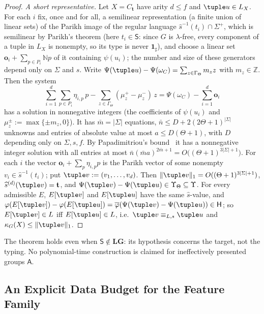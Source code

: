 \begin{proof}
\emph{A short representative.}  Let $X=C_{\mathbf t}$ have arity $d\le f$ and
$\tuple u\in L_X$.  For each $i$ fix, once and for all, a semilinear representation
(a finite union of linear sets) of the Parikh image of the regular language $\widehat s^{-1}(t_i)\cap\Sigma^+$,
which is semilinear by Parikh's theorem \cite{Parikh1966}
(here $t_i\in\mathsf S$: since $G$ is $\lambda$-free, every component of a tuple in
$L_X$ is nonempty, so its type is never $\mathbf 1_\sharp$), and
choose a linear set $\mathbf o_i+\sum_{p\in P_i}\mathbb Np$ of it containing $\psi(u_i)$;
the number and size of these generators depend only on $\Sigma$ and $s$.  Write
$\Psi(\tuple u)-\Psi(\omega_C)=\sum_{z\in\Gamma_\Theta}m_zz$ with $m_z\in\mathbb Z$.
Then the system
\[
 \sum_{i=1}^d\sum_{p\in P_i}\eta_{i,p}\,p-\sum_{z\in\Gamma_\Theta}(\mu^+_z-\mu^-_z)\,z
 =\Psi(\omega_C)-\sum_{i=1}^d\mathbf o_i
\]
has a solution in nonnegative integers (the coefficients of $\psi(u_i)$ and
$\mu^\pm_z:=\max\{\pm m_z,0\}$).  It has $\bar m=|\Sigma|$ equations,
$\bar n\le D+2(2\Theta+1)^{|\Sigma|}$ unknowns and entries of absolute value at most
$a\le D(\Theta+1)$, with $D$ depending only on $\Sigma,s,f$.  By Papadimitriou's
bound~\cite{Papadimitriou1981} it has a nonnegative integer solution with all
entries at most $\bar n(\bar m a)^{2\bar m+1}=O\bigl((\Theta+1)^{3|\Sigma|+1}\bigr)$.  For each $i$ the
vector $\mathbf o_i+\sum_p\eta_{i,p}p$ is the Parikh vector of some nonempty
$v_i\in\widehat s^{-1}(t_i)$; put $\tuple v:=(v_1,\ldots,v_d)$.  Then
$\|\tuple v\|_1=O((\Theta+1)^{3|\Sigma|+1})$, $\widehat s^{(d)}(\tuple v)=\mathbf t$, and
$\Psi(\tuple v)-\Psi(\tuple u)\in\Upsilon_\Theta\subseteq\Upsilon$.  For every admissible
$E$, $E[\tuple v]$ and $E[\tuple u]$ have the same $\widehat s$-value, and
$\varphi(E[\tuple v])-\varphi(E[\tuple u])=\overline\varphi(\Psi(\tuple v)-\Psi(\tuple u))
\in\mathsf H$; so $E[\tuple v]\in L$ iff $E[\tuple u]\in L$, i.e.\
$\tuple v\equiv_{L,s}\tuple u$ and $\kappa_G(X)\le\|\tuple v\|_1$.
\end{proof}

The theorem holds even when $\mathsf S\notin\mathbf{LG}$: its hypothesis concerns the
target, not the typing.  No polynomial-time construction is claimed for
ineffectively presented groups $\mathsf A$.

\subsection{An Explicit Data Budget for the Feature Family}
\label{app:feature-budget}

